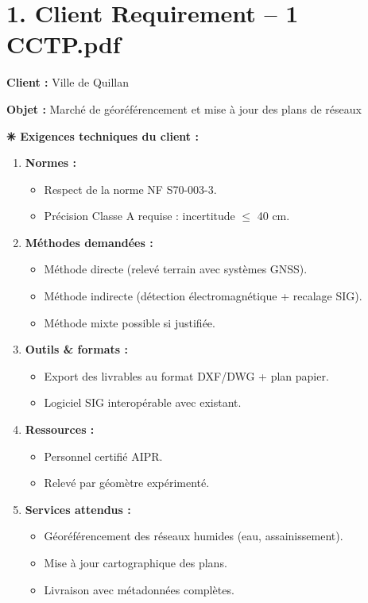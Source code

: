\documentclass[a4paper,12pt]{article}
\begin{document}
\section*{1. Client Requirement -- 1 CCTP.pdf}

\textbf{Client :} Ville de Quillan

\textbf{Objet :} Marché de géoréférencement et mise à jour des plans de réseaux

\vspace{0.5cm}

\textbf{✳️ Exigences techniques du client :}

\begin{enumerate}[label=\arabic*.]

\item \textbf{Normes :}

\begin{itemize}
  \item Respect de la norme NF S70-003-3.
  \item Précision Classe A requise : incertitude $\leq$ 40 cm.
\end{itemize}

\item \textbf{Méthodes demandées :}

\begin{itemize}
  \item Méthode directe (relevé terrain avec systèmes GNSS).
  \item Méthode indirecte (détection électromagnétique + recalage SIG).
  \item Méthode mixte possible si justifiée.
\end{itemize}

\item \textbf{Outils \& formats :}

\begin{itemize}
  \item Export des livrables au format DXF/DWG + plan papier.
  \item Logiciel SIG interopérable avec existant.
\end{itemize}

\item \textbf{Ressources :}

\begin{itemize}
  \item Personnel certifié AIPR.
  \item Relevé par géomètre expérimenté.
\end{itemize}

\item \textbf{Services attendus :}

\begin{itemize}
  \item Géoréférencement des réseaux humides (eau, assainissement).
  \item Mise à jour cartographique des plans.
  \item Livraison avec métadonnées complètes.
\end{itemize}

\end{enumerate}
\end{document}
